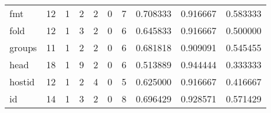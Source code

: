 \begin{longtable}{lrrrrrrrrr}
fmt       &                                      12 &                                                  1 &                                                  2 &                                                  2 &                                                  0 &                                                  7 &                                           0.708333 &                               0.916667 &                             0.583333 \\
fold      &                                      12 &                                                  1 &                                                  3 &                                                  2 &                                                  0 &                                                  6 &                                           0.645833 &                               0.916667 &                             0.500000 \\
groups    &                                      11 &                                                  1 &                                                  2 &                                                  2 &                                                  0 &                                                  6 &                                           0.681818 &                               0.909091 &                             0.545455 \\
head      &                                      18 &                                                  1 &                                                  9 &                                                  2 &                                                  0 &                                                  6 &                                           0.513889 &                               0.944444 &                             0.333333 \\
hostid    &                                      12 &                                                  1 &                                                  2 &                                                  4 &                                                  0 &                                                  5 &                                           0.625000 &                               0.916667 &                             0.416667 \\
id        &                                      14 &                                                  1 &                                                  3 &                                                  2 &                                                  0 &                                                  8 &                                           0.696429 &                               0.928571 &                             0.571429 \\

\end{longtable}
